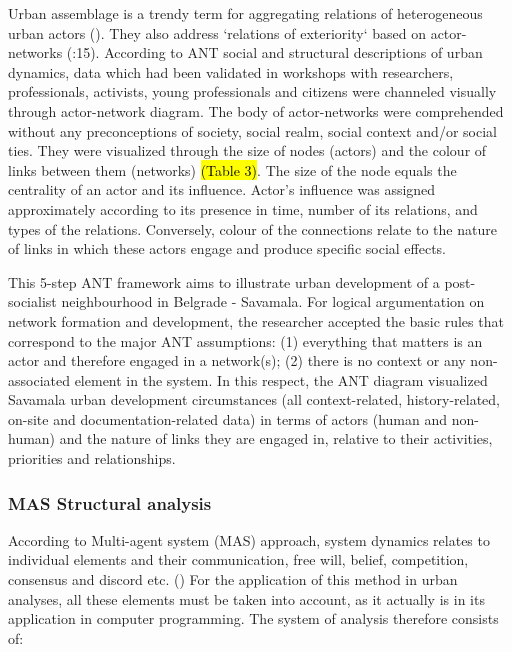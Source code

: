 \documentclass[11pt]{report}
\begin{document}
\begin{enumerate}
Urban assemblage is a trendy term for aggregating relations of heterogeneous urban actors (\cite{Muniesa et al. 2007}). They also address `relations of exteriority` based on actor-networks (\cite{Farías 2011}:15).
According to ANT social and structural descriptions of urban dynamics, data which had been validated in workshops with researchers, professionals, activists, young professionals and citizens were channeled visually through actor-network diagram. The body of actor-networks were comprehended without any preconceptions of society, social realm, social context and/or social ties. They were visualized through the size of nodes (actors) and the colour of links between them (networks) \hl{(Table 3)}. The size of the node equals the centrality of an actor and its influence. Actor’s influence was assigned approximately according to its presence in time, number of its relations, and types of the relations. Conversely, colour of the connections relate to the nature of links in which these actors engage and produce specific social effects.
\end{enumerate}

This 5-step ANT framework aims to illustrate urban development of a post-socialist neighbourhood in Belgrade - Savamala. For logical argumentation on network formation and development, the researcher accepted the basic rules that correspond to the major ANT assumptions:
(1) everything that matters is an actor and therefore engaged in a network(s);
(2) there is no context or any non-associated element in the system. In this respect, the ANT diagram visualized Savamala urban development circumstances (all context-related, history-related, on-site and documentation-related data) in terms of actors (human and non-human) and the nature of links they are engaged in, relative to their activities, priorities and relationships.


\subsubsection{MAS Structural analysis}

According to Multi-agent system (MAS) approach, system dynamics relates to individual elements and their communication, free will, belief, competition, consensus and discord etc. (\cite{Ferber 1999})
For the application of this method in urban analyses, all these elements must be taken into account, as it actually is in its application in computer programming. The system of analysis therefore consists of:
\end{document}
